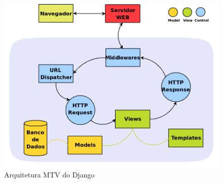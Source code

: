     \begin{figure}
        \begin{center}
    \includegraphics[width=1.0\linewidth]{arquivos/django_arquitetura.png}
        \end{center}
        \caption{Arquitetura MTV do Django}
        \label{django_arquitetura}
    \end{figure}
